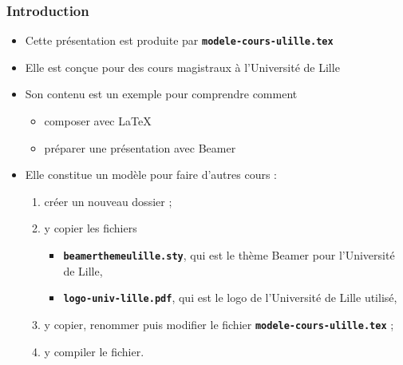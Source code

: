 \documentclass[10pt,t]{beamer}
\begin{document}
\begin{frame}%
  \frametitle{Introduction}


  \begin{itemize}
  \item Cette présentation est produite par \texttt{\textbf{modele-cours-ulille.tex}}
  \item Elle est conçue pour des cours magistraux à l'Université de Lille
  \item Son contenu est un exemple pour comprendre comment

    \begin{itemize}
    \item composer avec \LaTeX{}
    \item préparer une présentation avec Beamer
    \end{itemize}

  \end{itemize}

  \pause


  \begin{itemize}
  \item Elle constitue un modèle pour faire d'autres cours :
      
    \begin{enumerate}
    \item créer un nouveau dossier ;
    \item y copier les fichiers 
      
      \begin{itemize}
      \item \texttt{\textbf{beamerthemeulille.sty}}, qui est le thème Beamer pour l'Université de Lille,
      \item \texttt{\textbf{logo-univ-lille.pdf}}, qui est le logo de l'Université de Lille utilisé,
      \end{itemize}
      
    \item y copier, renommer puis modifier le fichier \texttt{\textbf{modele-cours-ulille.tex}} ;
    \item y compiler le fichier.
    \end{enumerate}
  \end{itemize}

  \pause

\end{frame}
\end{document}
